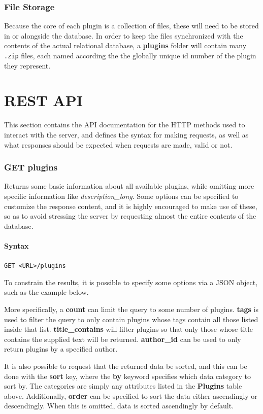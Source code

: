 \documentclass[a4paper, 12pt]{article}
\begin{document}
	\section{File Storage}
		Because the core of each plugin is a collection of files, these will need to be stored in or alongside the database. In order to keep the files synchronized with the contents of the actual relational database, a \textbf{plugins} folder will contain many \verb|.zip| files, each named according the the globally unique id number of the plugin they represent.

\part{REST API}
	This section contains the API documentation for the HTTP methods used to interact with the server, and defines the syntax for making requests, as well as what responses should be expected when requests are made, valid or not.

	\section{GET plugins}
		Returns some basic information about all available plugins, while omitting more specific information like \emph{description\_long}. Some options can be specified to customize the response content, and it is highly encouraged to make use of these, so as to avoid stressing the server by requesting almost the entire contents of the database.

		\subsection{Syntax}
			\verb|GET <URL>/plugins|

			To constrain the results, it is possible to specify some options via a JSON object, such as the example below.

			

			More specifically, a \textbf{count} can limit the query to some number of plugins. \textbf{tags} is used to filter the query to only contain plugins whose tags contain all those listed inside that list. \textbf{title\_contains} will filter plugins so that only those whose title contains the supplied text will be returned. \textbf{author\_id} can be used to only return plugins by a specified author.

			It is also possible to request that the returned data be sorted, and this can be done with the \textbf{sort} key, where the \textbf{by} keyword specifies which data category to sort by. The categories are simply any attributes listed in the \textbf{Plugins} table above. Additionally, \textbf{order} can be specified to sort the data either ascendingly or descendingly. When this is omitted, data is sorted ascendingly by default.
\end{document}
